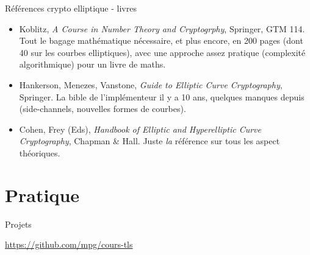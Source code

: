 \documentclass{mpg-ep-slides}
\begin{document}
\begin{frame}{Références crypto elliptique - livres}
  \begin{itemize}
    \item Koblitz, \emph{A Course in Number Theory and Cryptogrphy}, Springer,
      GTM 114. Tout le bagage mathématique nécessaire, et plus encore, en 200
      pages (dont 40 sur les courbes elliptiques), avec une approche assez
      pratique (complexité algorithmique) pour un livre de maths.
    \item Hankerson, Menezes, Vanstone, \emph{Guide to Elliptic Curve
        Cryptography}, Springer. La bible de l'implémenteur il y a 10 ans,
      quelques manques depuis (side-channels, nouvelles formes de courbes).
    \item Cohen, Frey (Eds), \emph{Handbook of Elliptic and Hyperelliptic
        Curve Cryptography}, Chapman \& Hall. Juste \emph{la} référence sur
      tous les aspect théoriques.
  \end{itemize}
\end{frame}

\section{Pratique}

\begin{frame}{Projets}
  \begin{center}
    \url{https://github.com/mpg/cours-tls}
  \end{center}
\end{frame}
\end{document}
